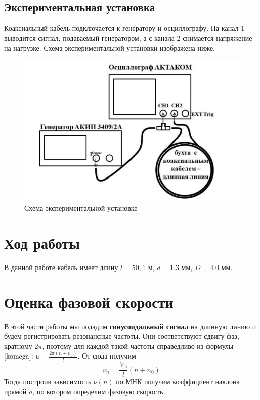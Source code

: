 \documentclass[a4paper,12pt]{article}
\theoremstyle{definition}
\begin{document}
 	\subsection*{Экспериментальная установка}
 	Коаксиальный кабель подключается к генератору и осциллографу. На канал 1 выводится сигнал, подаваемый генератором, а с канала 2 снимается напряжение на нагрузке. Схема экспериментальной установки изображена ниже.
 	\newpage
 	\begin{figure}[h]
 		\centering
 		\includegraphics[scale=1]{exp_sch.png}
 		\caption{Схема экспериментальной установке}
 	\end{figure}
 
\section*{Ход работы}
	В данной работе кабель имеет длину $l=50,1$ м, $d = 1.3$ мм, $D = 4.0$ мм.
 	

\section{Оценка фазовой скорости}
	В этой части работы мы подадим \textbf{синусоидальный сигнал} на длинную линию и будем регистрировать резонансные частоты. Они соответствуют сдвигу фаз, кратному $2\pi$, поэтому для каждой такой частоты справедливо из формулы \eqref{komega}: $k=\frac{2\pi (n+n_0)}{l}$. От сюда получим
 	\begin{equation}\label{mnkvgroup}
 		\nu_n=\frac{V_\text{ф}}{l}(n+n_0)
	\end{equation}
	Тогда построив зависимость $\nu(n)$ по МНК получим коэффициент наклона прямой $a$, по котором определим фазовую скорость.
\end{document}
